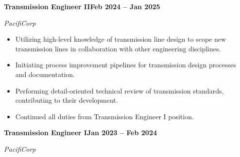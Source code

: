 \documentclass[10pt, letterpaper]{article}
\newcommand{\jobline}[2]{%
  \vspace{5pt}%
  \noindent\textbf{#1}\hfill\textbf{#2}\par%
  \vspace{1pt}%
}
\newcommand{\subline}[1]{%
  \vspace{-1pt}%
  \noindent\textit{#1}\par%
  \vspace{1pt}%
}
\newenvironment{rlist}{%
  \begin{itemize}[leftmargin=1.4em, itemsep=1pt, topsep=2pt, parsep=0pt]%
}{%
  \end{itemize}%
}
\begin{document}
\jobline{Transmission Engineer II}{Feb 2024 -- Jan 2025}
\subline{PacifiCorp}
\begin{rlist}
  \item Utilizing high-level knowledge of transmission line design to scope new transmission lines in collaboration with other engineering disciplines.
  \item Initiating process improvement pipelines for transmission design processes and documentation.
  \item Performing detail-oriented technical review of transmission standards, contributing to their development.
  \item Continued all duties from Transmission Engineer I position.
\end{rlist}

\jobline{Transmission Engineer I}{Jan 2023 -- Feb 2024}
\subline{PacifiCorp}
\end{document}
